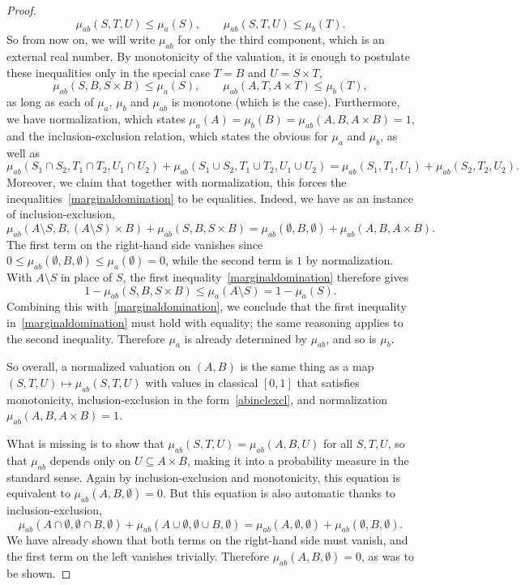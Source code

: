 \documentclass[11pt, oneside, article]{memoir}
\theoremstyle{plain}
\theoremstyle{definition}
\theoremstyle{remark}
\begin{document}
\begin{proof}
\[
	\mu_{ab}(S,T,U) \leq \mu_a(S), \qquad \mu_{ab}(S,T,U) \leq \mu_b(T).
\]
So from now on, we will write $\mu_{ab}$ for only the third component, which is an external real number. By monotonicity of the valuation, it is enough to postulate these inequalities only in the special case $T = B$ and $U = S\times T$,
\begin{equation}
\label{marginaldomination}
	\mu_{ab}(S,B,S\times B) \leq \mu_a(S), \qquad \mu_{ab}(A,T,A\times T) \leq \mu_b(T),
\end{equation}
as long as each of $\mu_a$, $\mu_b$ and $\mu_{ab}$ is monotone (which is the case). Furthermore, we have normalization, which states $\mu_a(A) = \mu_b(B) = \mu_{ab}(A,B,A\times B) = 1$, and the inclusion-exclusion relation, which states the obvious for $\mu_a$ and $\mu_b$, as well as
\begin{equation}
\label{abinclexcl}
	\mu_{ab}(S_1\cap S_2,T_1\cap T_2,U_1\cap U_2) + \mu_{ab}(S_1\cup S_2,T_1\cup T_2,U_1\cup U_2) = \mu_{ab}(S_1,T_1,U_1) + \mu_{ab}(S_2,T_2,U_2).
\end{equation}
Moreover, we claim that together with normalization, this forces the inequalities~\eqref{marginaldomination} to be equalities. Indeed, we have as an instance of inclusion-exclusion,
\[
	\mu_{ab}(A\setminus S,B,(A\setminus S)\times B) + \mu_{ab}(S,B,S\times B) = \mu_{ab}(\emptyset,B,\emptyset) + \mu_{ab}(A,B,A\times B).
\]
The first term on the right-hand side vanishes since $0 \leq \mu_{ab}(\emptyset,B,\emptyset) \leq \mu_a(\emptyset) = 0$, while the second term is $1$ by normalization. With $A\setminus S$ in place of $S$, the first inequality~\eqref{marginaldomination} therefore gives
\[
	1 - \mu_{ab}(S,B,S\times B) \leq \mu_a(A\setminus S) = 1 - \mu_a(S).
\]
Combining this with~\eqref{marginaldomination}, we conclude that the first inequality in~\eqref{marginaldomination} must hold with equality; the same reasoning applies to the second inequality. Therefore $\mu_a$ is already determined by $\mu_{ab}$, and so is $\mu_b$.

So overall, a normalized valuation on $(A,B)$ is the same thing as a map $(S,T,U)\longmapsto \mu_{ab}(S,T,U)$ with values in classical $[0,1]$ that satisfies monotonicity, inclusion-exclusion in the form~\eqref{abinclexcl}, and normalization $\mu_{ab}(A,B,A\times B) = 1$.

What is missing is to show that $\mu_{ab}(S,T,U) = \mu_{ab}(A,B,U)$ for all $S,T,U$, so that $\mu_{ab}$ depends only on $U\subseteq A\times B$, making it into a probability measure in the standard sense. Again by inclusion-exclusion and monotonicity, this equation is equivalent to $\mu_{ab}(A,B,\emptyset) = 0$. But this equation is also automatic thanks to inclusion-exclusion,
\[
	\mu_{ab}(A\cap \emptyset, \emptyset \cap B, \emptyset) + \mu_{ab}(A\cup \emptyset, \emptyset \cup B, \emptyset) = \mu_{ab}(A, \emptyset, \emptyset) + \mu_{ab}(\emptyset, B, \emptyset).
\]
We have already shown that both terms on the right-hand side must vanish, and the first term on the left vanishes trivially. Therefore $\mu_{ab}(A,B,\emptyset) = 0$, as was to be shown.
\end{proof}
\end{document}

